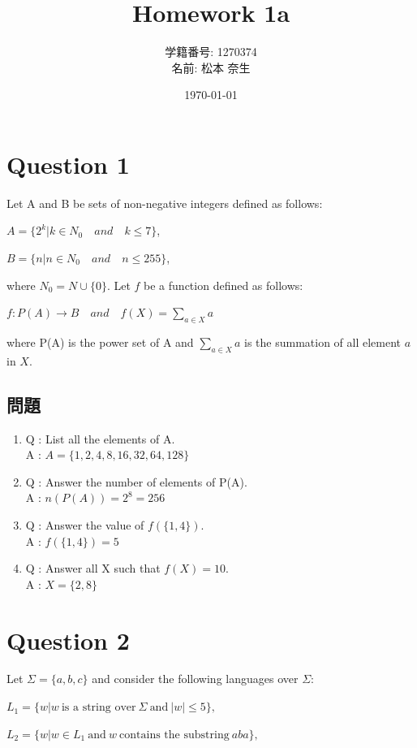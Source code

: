 \documentclass[uplatex,a4paper,11pt]{jsarticle}
\title{Homework 1a}
\author{学籍番号: 1270374 \\ 名前: 松本 奈生}
\date{\today}
\begin{document}
\maketitle

\section*{Question 1}
Let A and B be sets of non-negative integers defined as follows:

$
      A = \{2^k | k \in N_0 \quad and \quad k \le 7\}
$,

$
      B = \{n | n \in N_0 \quad and \quad n \le 255\}
$,

where $N_0 = N \cup \{0\}$. 
Let $f$ be a function defined as follows:

$f:P(A) \to B \quad and \quad f(X) = \sum_{a\in X} a$

where P(A) is the power set of A and $\sum_{a\in X} a$ is the 
summation of all element $a$ in $X$.

\subsection*{問題}
\begin{enumerate}
      \item Q : List all the elements of A. \\
            A : $A = \{1,2,4,8,16,32,64,128\}$
      \item Q : Answer the number of elements of P(A). \\
            A : $n(P(A)) = 2^8 = 256$
      \item Q : Answer the value of $f(\{1, 4\})$. \\
            A : $f(\{1,4\}) = 5$
      \item Q : Answer all X such that $f(X) = 10$. \\
            A : $X = \{2,8\}$
\end{enumerate}

\section*{Question 2}
Let $\Sigma = \{a,b,c\}$ and consider the following languages over $\Sigma$:


$L_1 = \{w | w \ \text{is a string over}  \ \Sigma  \  \text{and} \ |w| \le 5\},$

$L_2 = \{w | w \in L_1 \ \text{and} \ w \ \text{contains the substring} \ a b a \},$
\end{document}
